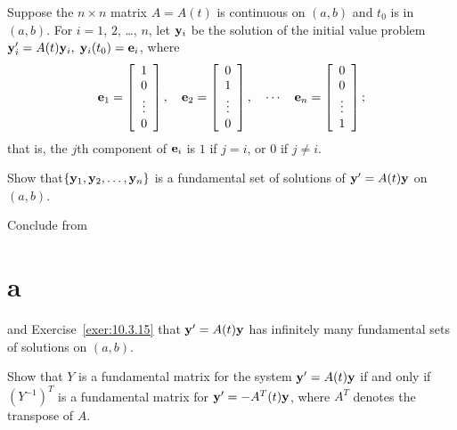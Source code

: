 \begin{exerciselist}
  \item\label{exer:10.3.16} Suppose the $n\times n$ matrix $A=A(t)$ is continuous on $(a,b)$ and
        $t_{0}$ is in $(a,b)$. For $i=1$, $2$, \dots, $n$, let ${\bf y}_{i}$ be the solution of the
        initial value problem ${\bf y}_{i}'=A(t){\bf y}_{i},\;{\bf y}_{i}(t_{0})={\bf e}_{i}$, where
  \[
    {\bf e}_{1}=\left[
    \begin{array}{c}
      1      \\
      0      \\
      \vdots \\
      0
    \end{array}\right],\quad{\bf e}_{2}=\left[
    \begin{array}{c}
      0      \\
      1      \\
      \vdots \\
      0
    \end{array}\right],\quad\cdots\quad{\bf e}_{n}=\left[
    \begin{array}{c}
      0      \\
      0      \\
      \vdots \\
      1
    \end{array}\right];
  \]
  that is, the $j$th component of ${\bf e}_{i}$ is $1$ if $j=i$, or $0$ if $j\ne i$.

  \begin{alist}
    \item %
    Show that$\{{\bf y}_{1},{\bf y}_{2},\dots,{\bf y}_{n}\}$ is a fundamental set of solutions of
    ${\bf y}'=A(t){\bf y}$ on $(a,b)$.

    \item %
    Conclude from \part{a} and Exercise~\ref{exer:10.3.15} that ${\bf y}'= A(t){\bf y}$ has
    infinitely many fundamental sets of solutions on $(a,b)$.
  \end{alist}

  \item\label{exer:10.3.17} Show that $Y$ is a fundamental matrix for the system
        ${\bf y}'=A(t){\bf y}$ if and only if $(Y^{-1})^{T}$ is a fundamental matrix for
        ${\bf y}'=- A^{T}(t){\bf y}$, where $A^{T}$ denotes the transpose of $A$. 

  \enlargethispage{1in}


\end{exerciselist}
